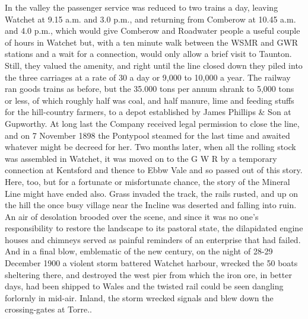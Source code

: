 \documentclass[11pt]{book}
\begin{document}
    In the valley the passenger service was reduced to two trains a day, leaving Watchet at 9.15 a.m. and 3.0 p.m., and returning from Comberow at 10.45 a.m. and 4.0 p.m., which would give Comberow and Roadwater people a useful couple of hours in Watchet but, with a ten minute walk between the WSMR and GWR stations and a wait for a connection, would only allow  a brief visit to Taunton.  Still, they valued the amenity, and right until the line closed down they piled into the three carriages at a rate of 30 a day or 9,000 to 10,000 a year.
   The railway ran goods trains as before, but the 35.000 tons per annum shrank to 5,000 tons or less, of which roughly half was coal, and half manure, lime and feeding stuffs for the hill-country farmers, to a depot established by James Phillips \& Son at Gupworthy. 
   At long last the Company received legal permission to close the line, and on 7 November 1898 the Pontypool steamed for the last time and awaited whatever might be decreed for her. Two months later, when all the rolling stock was assembled in Watchet, it was moved on to the G W R by a temporary connection at Kentsford and thence to Ebbw Vale and so passed out of this story.
  Here, too, but for a fortunate or misfortunate chance, the story of the Mineral Line might have ended also. Grass invaded the track, the rails rusted, and up on the hill the once busy village near the Incline was deserted and falling into ruin.  An air of desolation brooded over the scene, and since it was no one’s responsibility to restore the landscape to its pastoral state, the dilapidated engine houses and chimneys served as painful reminders of an enterprise that had failed. And in a final blow, emblematic of the new century, on the night of 28-29 December 1900 a violent storm battered Watchet harbour, wrecked the 50 boats sheltering there, and destroyed the west pier from which the iron ore, in better days, had been shipped to Wales and  the twisted rail could be seen dangling forlornly in mid-air. Inland, the storm wrecked signals and blew down the crossing-gates at Torre..
\end{document}
